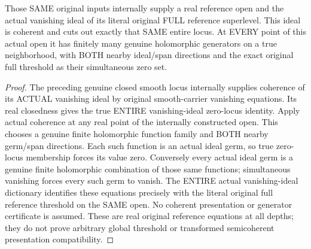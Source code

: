 \begin{theorem}
\label{hir:original-all-depth-full-reference-value-coherent-ideal-equations}
\leanok
{}
Those SAME original inputs internally supply a real reference open and the
actual vanishing ideal of its literal original FULL reference superlevel.
This ideal is coherent and cuts out exactly that SAME entire locus. At EVERY
point of this actual open it has finitely many genuine holomorphic generators
on a true neighborhood, with BOTH nearby ideal/span directions and the exact
original full threshold as their simultaneous zero set.
\end{theorem}
\begin{proof}
The preceding genuine closed smooth locus internally supplies coherence of
its ACTUAL vanishing ideal by original smooth-carrier vanishing equations.
Its real closedness gives the true ENTIRE vanishing-ideal zero-locus identity.
Apply actual coherence at any real point of the internally constructed open.
This chooses a genuine finite holomorphic function family and BOTH nearby
germ/span directions. Each such function is an actual ideal germ, so true
zero-locus membership forces its value zero. Conversely every actual ideal
germ is a genuine finite holomorphic combination of those same functions;
simultaneous vanishing forces every such germ to vanish. The ENTIRE actual
vanishing-ideal dictionary identifies these equations precisely with the
literal original full reference threshold on the SAME open. No coherent
presentation or generator certificate is assumed. These are real original
reference equations at all depths; they do not prove arbitrary global
threshold or transformed semicoherent presentation compatibility.
\end{proof}
